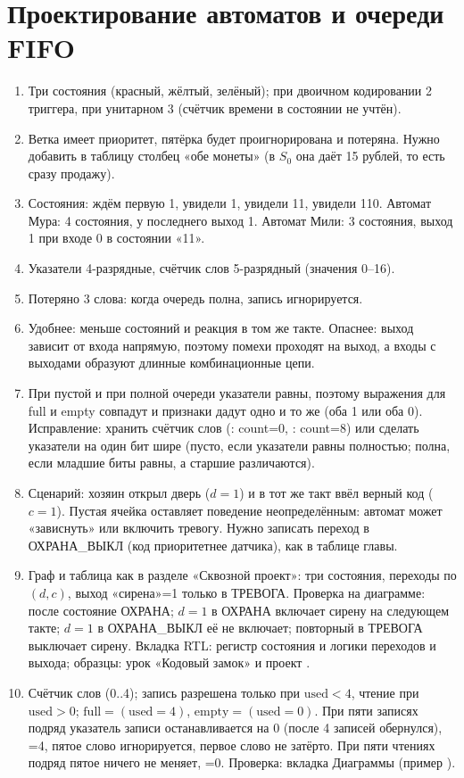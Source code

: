 \section*{Проектирование автоматов и очереди FIFO}
\begin{enumerate}
  \item {} Три состояния (красный, жёлтый, зелёный); при двоичном кодировании 2 триггера, при унитарном 3 (счётчик времени в состоянии не учтён).
  \item {} Ветка  имеет приоритет, пятёрка будет проигнорирована и потеряна. Нужно добавить в таблицу столбец «обе монеты» (в $S_0$ она даёт 15 рублей, то есть сразу продажу).
  \item {} Состояния: ждём первую 1, увидели 1, увидели 11, увидели 110. Автомат Мура: 4 состояния, у последнего выход 1. Автомат Мили: 3 состояния, выход 1 при входе 0 в состоянии «11».
  \item {} Указатели 4-разрядные, счётчик слов 5-разрядный (значения 0--16).
  \item {} Потеряно 3 слова: когда очередь полна, запись игнорируется.
  \item {} Удобнее: меньше состояний и реакция в том же такте. Опаснее: выход зависит от входа напрямую, поэтому помехи проходят на выход, а входы с выходами образуют длинные комбинационные цепи.
  \item {} При пустой и при полной очереди указатели равны, поэтому выражения для full и empty совпадут и признаки дадут одно и то же (оба 1 или оба 0). Исправление: хранить счётчик слов (: count=0, : count=8) или сделать указатели на один бит шире (пусто, если указатели равны полностью; полна, если младшие биты равны, а старшие различаются).
  \item {} Сценарий: хозяин открыл дверь ($d=1$) и в тот же такт ввёл верный код ($c=1$). Пустая ячейка оставляет поведение неопределённым: автомат может «зависнуть» или включить тревогу. Нужно записать переход в ОХРАНА\_ВЫКЛ (код приоритетнее датчика), как в таблице главы.
  \item {} Граф и таблица как в разделе «Сквозной проект»: три состояния, переходы по $(d,c)$, выход «сирена»=1 только в ТРЕВОГА. Проверка на диаграмме: после  состояние ОХРАНА; $d=1$ в ОХРАНА включает сирену на следующем такте; $d=1$ в ОХРАНА\_ВЫКЛ её не включает; повторный  в ТРЕВОГА выключает сирену. Вкладка RTL: регистр состояния и логики переходов и выхода; образцы: урок «Кодовый замок» и проект .
  \item {} Счётчик слов  (0..4); запись разрешена только при $\text{used}<4$, чтение при $\text{used}>0$; $\text{full}=(\text{used}=4)$, $\text{empty}=(\text{used}=0)$. При пяти записях подряд указатель записи останавливается на 0 (после 4 записей обернулся), =4, пятое слово игнорируется, первое слово не затёрто. При пяти чтениях подряд пятое ничего не меняет, =0. Проверка: вкладка Диаграммы (пример ).
\end{enumerate}

